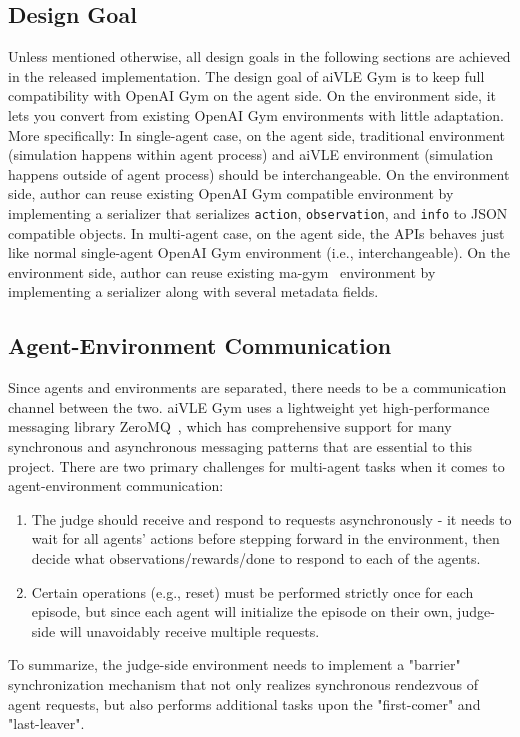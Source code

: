 \documentclass[fyp]{socreport}
\begin{document}
\subsection{Design Goal}
Unless mentioned otherwise, all design goals in the following sections are achieved in the released implementation. 
The design goal of aiVLE Gym is to keep full compatibility with OpenAI Gym on the agent side. On the environment side, it lets you convert from existing OpenAI Gym environments with little adaptation. More specifically:
In single-agent case, on the agent side, traditional environment (simulation happens within agent process) and aiVLE environment (simulation happens outside of agent process) should be interchangeable. On the environment side, author can reuse existing OpenAI Gym compatible environment by implementing a serializer that serializes \texttt{action}, \texttt{observation}, and \texttt{info} to JSON compatible objects.
In multi-agent case, on the agent side, the APIs behaves just like normal single-agent OpenAI Gym environment (i.e., interchangeable). On the environment side, author can reuse existing ma-gym~\cite{magym} environment by implementing a serializer along with several metadata fields. 

\subsection{Agent-Environment Communication}
Since agents and environments are separated, there needs to be a communication channel between the two. aiVLE Gym uses a lightweight yet high-performance messaging library ZeroMQ~\cite{zeromq}, which has comprehensive support for many synchronous and asynchronous messaging patterns that are essential to this project. There are two primary challenges for multi-agent tasks when it comes to agent-environment communication:
\begin{enumerate}
    \item The judge should receive and respond to requests asynchronously - it needs to wait for all agents' actions before stepping forward in the environment, then decide what observations/rewards/done to respond to each of the agents.
    \item Certain operations (e.g., reset) must be performed strictly once for each episode, but since each agent will initialize the episode on their own, judge-side will unavoidably receive multiple requests.
\end{enumerate}

To summarize, the judge-side environment needs to implement a "barrier" synchronization mechanism that not only realizes synchronous rendezvous of agent requests, but also performs additional tasks upon the "first-comer" and "last-leaver". 
\end{document}
